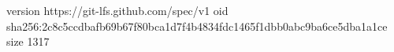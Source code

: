 version https://git-lfs.github.com/spec/v1
oid sha256:2c8c5ccdbafb69b67f80bca1d7f4b4834fdc1465f1dbb0abc9ba6ce5dba1a1ce
size 1317
